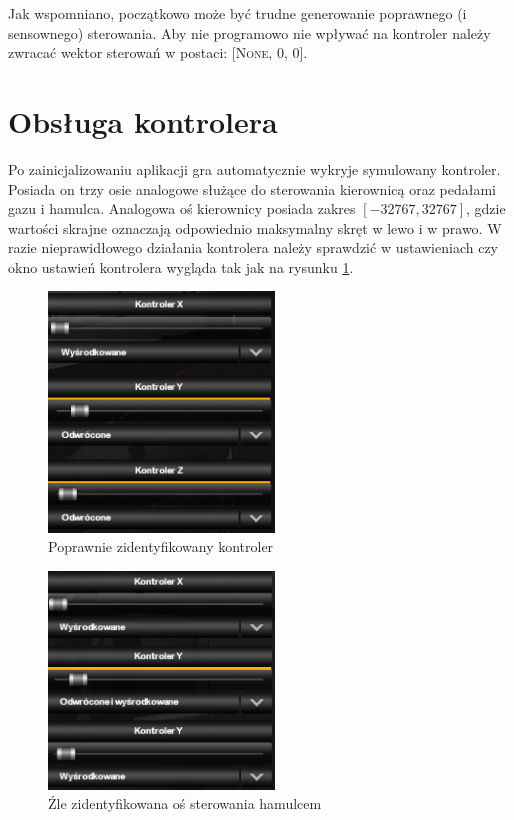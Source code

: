 Jak wspomniano, początkowo może być trudne generowanie poprawnego (i sensownego) sterowania. Aby nie programowo nie wpływać na kontroler należy zwracać wektor sterowań w postaci: \textsc{[None, 0, 0]}.

\section{Obsługa kontrolera}
Po zainicjalizowaniu aplikacji gra automatycznie wykryje symulowany kontroler. Posiada on trzy osie analogowe służące do sterowania kierownicą oraz pedałami gazu i hamulca. Analogowa oś kierownicy posiada zakres $[-32767, 32767]$, gdzie wartości skrajne oznaczają odpowiednio maksymalny skręt w lewo i w prawo. W razie nieprawidłowego działania kontrolera należy sprawdzić w ustawieniach czy okno ustawień kontrolera wygląda tak jak na rysunku \ref{fig:appendix1_controller}.

\begin{figure}
  \centering
  \includegraphics[width=6cm]{img/appendix1_controller.png}
  \caption{Poprawnie zidentyfikowany kontroler}
  \label{fig:appendix1_controller}
\end{figure}

\begin{figure}
  \centering
  \includegraphics[width=6cm]{img/appendix1_bad_controller.png}
  \caption{Źle zidentyfikowana oś sterowania hamulcem}
  \label{fig:appendix1_bad_controller}
\end{figure}

